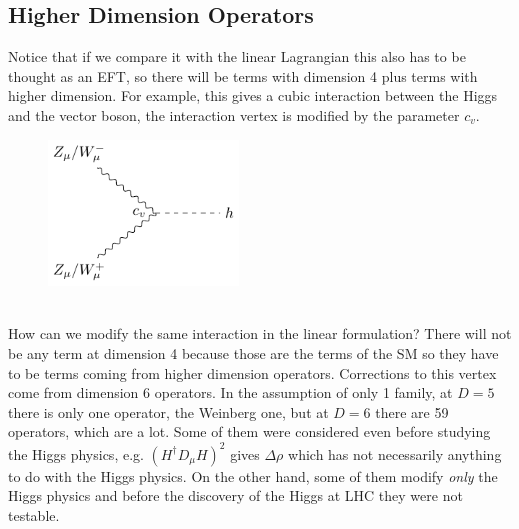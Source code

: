 \documentclass[../main.tex]{subfiles}
\begin{document}
\subsection{Higher Dimension Operators}
Notice that if we compare it with the linear Lagrangian this also has to be thought as an EFT, so there will be terms with dimension 4 plus terms with higher dimension.
For example, this gives a cubic interaction between the Higgs and the vector boson, the interaction vertex is modified by the parameter $c_v$.
\begin{figure}[h]
    \centering
    \includegraphics[width=0.45\textwidth]{Images/zwcv.pdf}
    \caption*{}
\end{figure}\\
How can we modify the same interaction in the linear formulation? There will not be any term at dimension 4 because those are the terms of the SM so they have to be terms coming from higher dimension operators. Corrections to this vertex come from dimension 6 operators. In the assumption of only 1 family, at $D=5$ there is only one operator, the Weinberg one, but at $D=6$ there are 59 operators, which are a lot. Some of them were considered even before studying the Higgs physics, e.g. $(H^\dagger D_\mu H)^2$ gives $\Delta\rho$ which has not necessarily anything to do with the Higgs physics. On the other hand, some of them modify \textit{only} the Higgs physics and before the discovery of the Higgs at LHC they were not testable.
\end{document}

